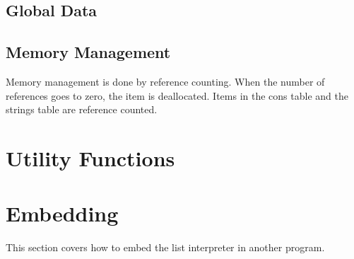 \documentclass[10pt, openany]{book}
\begin{document}
\subsection{Global Data}

\subsection{Memory Management}
Memory management is done by reference counting.  When the number of references goes to zero, the item is deallocated.  Items in the cons table and the strings table are reference counted.

\section{Utility Functions}

\section{Embedding}
This section covers how to embed the list interpreter in another program.
\end{document}
